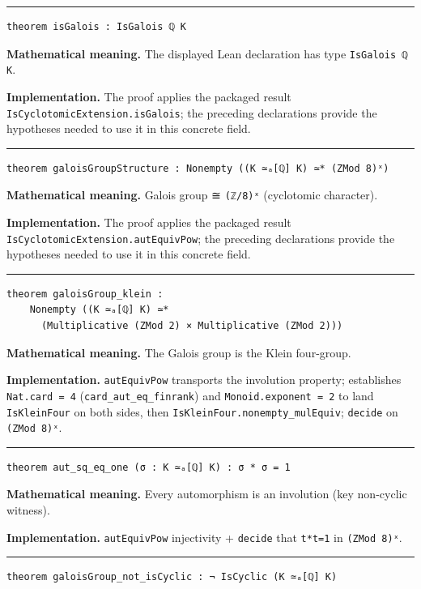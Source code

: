\documentclass[UTF8,a4paper,11pt,fontset=fandol]{ctexart}
\theoremstyle{definition}
\newcommand{\statementsep}{\par\medskip\hrule\medskip}
\begin{document}
\statementsep
\begin{verbatim}
theorem isGalois : IsGalois ℚ K
\end{verbatim}
\noindent\textbf{Mathematical meaning.} The displayed Lean declaration has type \texttt{IsGalois ℚ K}.\par
\noindent\textbf{Implementation.} The proof applies the packaged result \texttt{IsCyclotomicExtension.\allowbreak{}isGalois}; the preceding declarations provide the hypotheses needed to use it in this concrete field.\par
\statementsep
\begin{verbatim}
theorem galoisGroupStructure : Nonempty ((K ≃ₐ[ℚ] K) ≃* (ZMod 8)ˣ)
\end{verbatim}
\noindent\textbf{Mathematical meaning.} Galois group ≅ \texttt{(ℤ/\allowbreak{}8)ˣ} (cyclotomic character).\par
\noindent\textbf{Implementation.} The proof applies the packaged result \texttt{IsCyclotomicExtension.\allowbreak{}autEquivPow}; the preceding declarations provide the hypotheses needed to use it in this concrete field.\par
\statementsep
\begin{verbatim}
theorem galoisGroup_klein :
    Nonempty ((K ≃ₐ[ℚ] K) ≃*
      (Multiplicative (ZMod 2) × Multiplicative (ZMod 2)))
\end{verbatim}
\noindent\textbf{Mathematical meaning.} The Galois group is the Klein four-group.\par
\noindent\textbf{Implementation.} \texttt{autEquivPow} transports the involution property; establishes \texttt{Nat.\allowbreak{}card = 4} (\texttt{card\_\allowbreak{}aut\_\allowbreak{}eq\_\allowbreak{}finrank}) and \texttt{Monoid.\allowbreak{}exponent = 2} to land \texttt{IsKleinFour} on both sides, then \texttt{IsKleinFour.\allowbreak{}nonempty\_\allowbreak{}mulEquiv}; \texttt{decide} on \texttt{(ZMod 8)ˣ}.\par
\statementsep
\begin{verbatim}
theorem aut_sq_eq_one (σ : K ≃ₐ[ℚ] K) : σ * σ = 1
\end{verbatim}
\noindent\textbf{Mathematical meaning.} Every automorphism is an involution (key non-cyclic witness).\par
\noindent\textbf{Implementation.} \texttt{autEquivPow} injectivity + \texttt{decide} that \texttt{t*t=1} in \texttt{(ZMod 8)ˣ}.\par
\statementsep
\begin{verbatim}
theorem galoisGroup_not_isCyclic : ¬ IsCyclic (K ≃ₐ[ℚ] K)
\end{verbatim}
\end{document}

